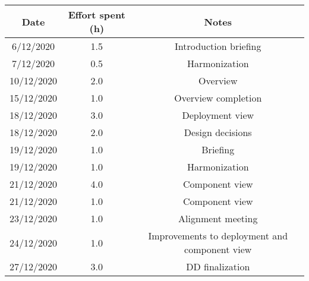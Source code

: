 \documentclass[../../main.tex]{subfiles}
\begin{document}
    \begin{center}
        \begin{tabular}{|c| |c| |c|} 
            \hline
            Date & Effort spent (h) & Notes\\ [0.5ex] 
            \hline\hline
            6/12/2020 & 1.5 & Introduction briefing\\ 
            7/12/2020 & 0.5 & Harmonization\\
            10/12/2020 & 2.0 & Overview\\
            15/12/2020 & 1.0 & Overview completion\\
            18/12/2020 & 3.0 & Deployment view\\
            18/12/2020 & 2.0 & Design decisions\\
            19/12/2020 & 1.0 & Briefing\\
            19/12/2020 & 1.0 & Harmonization\\
            21/12/2020 & 4.0 & Component view\\
            21/12/2020 & 1.0 & Component view\\
            23/12/2020 & 1.0 & Alignment meeting\\
            24/12/2020 & 1.0 & Improvements to deployment and component view\\
            27/12/2020 & 3.0 & DD finalization\\
            \hline
        \end{tabular}
    \end{center}
\end{document}
